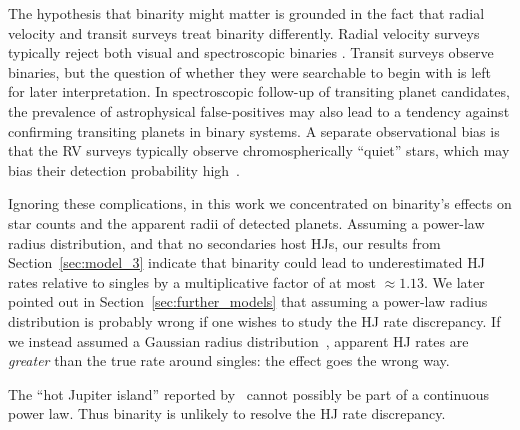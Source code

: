 \documentclass[12pt,modern]{aastex61}
\begin{document}
The hypothesis that binarity might matter is grounded in the fact that radial 
velocity and transit surveys treat binarity differently.
Radial velocity surveys typically reject both visual and spectroscopic binaries
\citep[\textit{e.g.},][]{wright_frequency_2012}.
Transit surveys observe binaries, but the question of whether they 
were searchable to begin with is left for later interpretation.
In spectroscopic follow-up of transiting planet candidates, the prevalence of 
astrophysical false-positives may also lead to a tendency against confirming 
transiting planets in binary systems.
A separate observational bias is that the RV surveys typically observe 
chromospherically ``quiet'' stars, which may bias their detection probability 
high~\citep{bastien_radial_2014}.

Ignoring these complications, in this work we concentrated on binarity's 
effects on star counts and the apparent radii of detected planets.
Assuming a power-law radius distribution, and that no secondaries host HJs,
our results from Section~\ref{sec:model_3} indicate that binarity 
could lead to underestimated HJ rates relative to singles by a multiplicative 
factor of at most $\approx 1.13$.
We later pointed out in Section~\ref{sec:further_models} that assuming a 
power-law radius distribution is probably wrong if one wishes to study the HJ 
rate discrepancy.
If we instead assumed a Gaussian radius 
distribution~\citep[following][]{petigura_CKS_2017}, apparent 
HJ rates are {\it greater} than the true rate around singles: the effect goes 
the wrong way.

The ``hot Jupiter island'' reported by~\citet{petigura_CKS_2017} cannot 
possibly be part of a continuous power law. 
Thus binarity is unlikely to resolve the HJ rate discrepancy.
\end{document}
